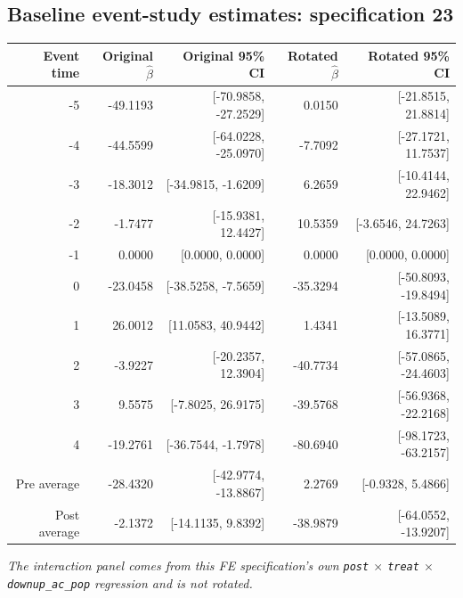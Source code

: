 \documentclass[10pt]{article}
\begin{document}
\subsection*{Baseline event-study estimates: specification 23}
\begin{center}
\scriptsize
\begin{tabular}{r rr rr}
\toprule
Event time & Original $\hat\beta$ & Original 95\% CI & Rotated $\hat\beta$ & Rotated 95\% CI \\
\midrule
-5 & -49.1193 & [-70.9858, -27.2529] & 0.0150 & [-21.8515, 21.8814] \\
-4 & -44.5599 & [-64.0228, -25.0970] & -7.7092 & [-27.1721, 11.7537] \\
-3 & -18.3012 & [-34.9815, -1.6209] & 6.2659 & [-10.4144, 22.9462] \\
-2 & -1.7477 & [-15.9381, 12.4427] & 10.5359 & [-3.6546, 24.7263] \\
-1 & 0.0000 & [0.0000, 0.0000] & 0.0000 & [0.0000, 0.0000] \\
0 & -23.0458 & [-38.5258, -7.5659] & -35.3294 & [-50.8093, -19.8494] \\
1 & 26.0012 & [11.0583, 40.9442] & 1.4341 & [-13.5089, 16.3771] \\
2 & -3.9227 & [-20.2357, 12.3904] & -40.7734 & [-57.0865, -24.4603] \\
3 & 9.5575 & [-7.8025, 26.9175] & -39.5768 & [-56.9368, -22.2168] \\
4 & -19.2761 & [-36.7544, -1.7978] & -80.6940 & [-98.1723, -63.2157] \\
\midrule
Pre average & -28.4320 & [-42.9774, -13.8867] & 2.2769 & [-0.9328, 5.4866] \\
Post average & -2.1372 & [-14.1135, 9.8392] & -38.9879 & [-64.0552, -13.9207] \\
\bottomrule
\end{tabular}
\end{center}
\medskip
\textit{The interaction panel comes from this FE specification's own \texttt{post} $\times$ \texttt{treat} $\times$ \texttt{downup\_ac\_pop} regression and is not rotated.}
\clearpage
\end{document}
